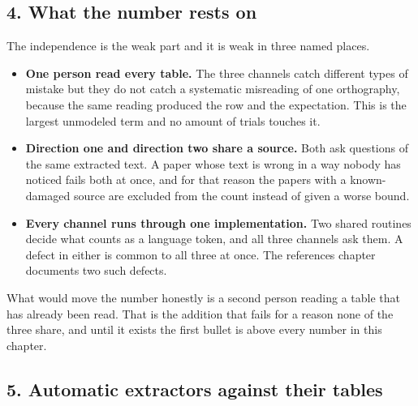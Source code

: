 \subsection{4. What the number rests on}

The independence is the weak part and it is weak in three named places.

\begin{itemize}
\item \textbf{One person read every table.} The three channels catch different types of mistake but they do not catch a systematic misreading of one orthography, because the same reading produced the row and the expectation. This is the largest unmodeled term and no amount of trials touches it.
\item \textbf{Direction one and direction two share a source.} Both ask questions of the same extracted text. A paper whose text is wrong in a way nobody has noticed fails both at once, and for that reason the papers with a known-damaged source are excluded from the count instead of given a worse bound.
\item \textbf{Every channel runs through one implementation.} Two shared routines decide what counts as a language token, and all three channels ask them. A defect in either is common to all three at once. The references chapter documents two such defects.
\end{itemize}

What would move the number honestly is a second person reading a table that has already been read. That is the addition that fails for a reason none of the three share, and until it exists the first bullet is above every number in this chapter.

\subsection{5. Automatic extractors against their tables}

